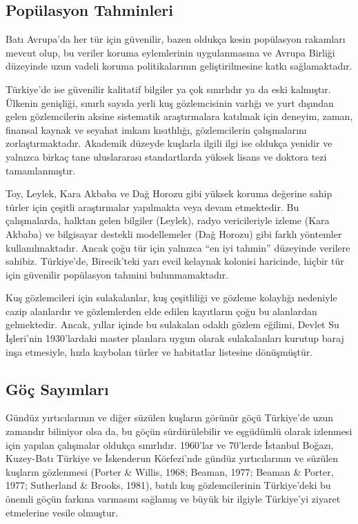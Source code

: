 \documentclass[
  a4paper,
  DIV=11,
  numbers=noendperiod]{scrreprt}
\begin{document}
\subsection*{Popülasyon Tahminleri}\label{popuxfclasyon-tahminleri}

Batı Avrupa'da her tür için güvenilir, bazen oldukça kesin popülasyon
rakamları mevcut olup, bu veriler koruma eylemlerinin uygulanmasına ve
Avrupa Birliği düzeyinde uzun vadeli koruma politikalarının
geliştirilmesine katkı sağlamaktadır.

Türkiye'de ise güvenilir kalitatif bilgiler ya çok sınırlıdır ya da eski
kalmıştır. Ülkenin genişliği, sınırlı sayıda yerli kuş gözlemcisinin
varlığı ve yurt dışından gelen gözlemcilerin aksine sistematik
araştırmalara katılmak için deneyim, zaman, finansal kaynak ve seyahat
imkanı kısıtlılığı, gözlemcilerin çalışmalarını zorlaştırmaktadır.
Akademik düzeyde kuşlarla ilgili ilgi ise oldukça yenidir ve yalnızca
birkaç tane uluslararası standartlarda yüksek lisans ve doktora tezi
tamamlanmıştır.

Toy, Leylek, Kara Akbaba ve Dağ Horozu gibi yüksek koruma değerine sahip
türler için çeşitli araştırmalar yapılmakta veya devam etmektedir. Bu
çalışmalarda, halktan gelen bilgiler (Leylek), radyo vericileriyle
izleme (Kara Akbaba) ve bilgisayar destekli modellemeler (Dağ Horozu)
gibi farklı yöntemler kullanılmaktadır. Ancak çoğu tür için yalnızca
``en iyi tahmin'' düzeyinde verilere sahibiz. Türkiye'de, Birecik'teki
yarı evcil kelaynak kolonisi haricinde, hiçbir tür için güvenilir
popülasyon tahmini bulunmamaktadır.

Kuş gözlemcileri için sulakalanlar, kuş çeşitliliği ve gözleme kolaylığı
nedeniyle cazip alanlardır ve gözlemlerden elde edilen kayıtların çoğu
bu alanlardan gelmektedir. Ancak, yıllar içinde bu sulakalan odaklı
gözlem eğilimi, Devlet Su İşleri'nin 1930'lardaki master planlara uygun
olarak sulakalanları kurutup baraj inşa etmesiyle, hızla kaybolan türler
ve habitatlar listesine dönüşmüştür.

\subsection*{Göç Sayımları}\label{guxf6uxe7-sayux131mlarux131}

Gündüz yırtıcılarının ve diğer süzülen kuşların görünür göçü Türkiye'de
uzun zamandır biliniyor olsa da, bu göçün sürdürülebilir ve eşgüdümlü
olarak izlenmesi için yapılan çalışmalar oldukça sınırlıdır. 1960'lar ve
70'lerde İstanbul Boğazı, Kuzey-Batı Türkiye ve İskenderun Körfezi'nde
gündüz yırtıcılarının ve süzülen kuşların gözlenmesi (Porter \& Willis,
1968; Beaman, 1977; Beaman \& Porter, 1977; Sutherland \& Brooks, 1981),
batılı kuş gözlemcilerinin Türkiye'deki bu önemli göçün farkına
varmasını sağlamış ve büyük bir ilgiyle Türkiye'yi ziyaret etmelerine
vesile olmuştur.
\end{document}
